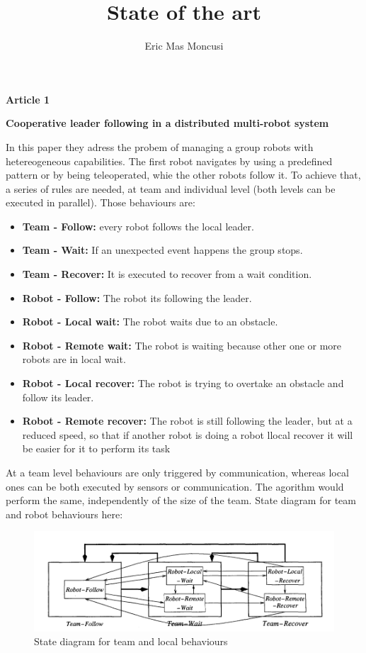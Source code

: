 \documentclass{article}
\title{State of the art}
\author{Eric Mas Moncusi}
\date{}
\begin{document}
\maketitle
\begin{center}
\textbf{\Large Article 1}

\textbf{\Large }

\textbf{\large Cooperative leader following in a distributed multi-robot system}
\end{center}


In this paper they adress the probem of managing a group robots with hetereogeneous capabilities. The first robot navigates by using a predefined pattern or by being teleoperated, whie the other robots follow it. To achieve that, a series of rules are needed, at team and individual level (both levels can be executed in parallel). Those behaviours are:
\begin{itemize}
	\item \textbf{Team - Follow:} every robot follows the local leader.
	\item \textbf{Team - Wait:} If an unexpected event happens the group stops.
	\item \textbf{Team - Recover:} It is executed to recover from a wait condition.
	\item \textbf{Robot - Follow:} The robot its following the leader.
	\item \textbf{Robot - Local wait:} The robot waits due to an obstacle.
	\item \textbf{Robot - Remote wait:} The robot is waiting because other one or more robots are in local wait.
	\item \textbf{Robot - Local recover:} The robot is trying to overtake an obstacle and follow its leader.
	\item \textbf{Robot - Remote recover:} The robot is still following the leader, but at a reduced speed, so that if another robot is doing a robot llocal recover it will be easier for it to perform its task
\end{itemize}


At a team level behaviours are only triggered by communication, whereas local ones can be both executed by sensors or communication. The agorithm would perform the same, independently of the size of the team. State diagram for team and robot behaviours here:

\begin{figure}[H]
    \includegraphics[width=1\textwidth]{figures/state_table_article1.png}
    \caption{State diagram for team and local behaviours}
    \label{fig:fig1}
\end{figure}
\end{document}
